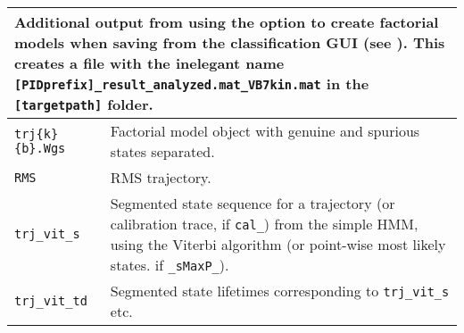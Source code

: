 \begin{table*}
\begin{center}
\begin{tabular}{|l|l|}
\hline
\hline
\multicolumn{2}{|l|}{\parbox[t]{1.5\columnwidth}{\parbox[t]{1.5\columnwidth}{
Additional output from using the option to create factorial models
when saving from the classification GUI
(see ). This creates a file with the inelegant
name
\texttt{[PIDprefix]\_result\_analyzed.mat\_VB7kin.mat} in the \texttt{[targetpath]} folder.
}}}\\\hline
\texttt{trj\{k\}\{b\}.Wgs}& Factorial model object with genuine and spurious states separated.
\\\hline
\texttt{RMS}&RMS trajectory.
\\\hline
\texttt{trj\_vit\_s}& \parbox[t]{1.25\columnwidth}{
Segmented state sequence for a trajectory (or calibration trace,
if \texttt{cal\_}) from the simple HMM, using the Viterbi algorithm
(or point-wise most likely states. if \texttt{\_sMaxP\_}).}
\\\hline
\texttt{trj\_vit\_td}& \parbox[t]{1.25\columnwidth}{
Segmented state lifetimes corresponding to \texttt{trj\_vit\_s}
etc.}\\
\hline
\end{tabular}\end{center}
\end{table*}

